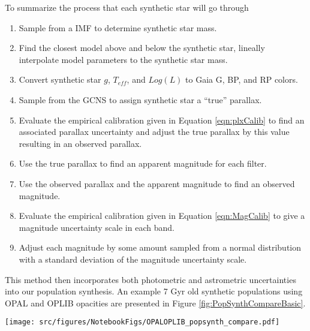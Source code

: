 To summarize the process that each synthetic star will go through
\begin{enumerate}
	\item Sample from a \citet{Sollima2019} IMF to determine synthetic star mass.
	\item Find the closest model above and below the synthetic star, lineally
		interpolate model parameters to the synthetic star mass.
	\item Convert synthetic star $g$, $T_{eff}$, and $Log(L)$ to Gaia G, BP,
		and RP colors.
	\item Sample from the GCNS to assign synthetic star a ``true'' parallax.
	\item Evaluate the empirical calibration given in Equation
		\ref{eqn:plxCalib} to find an associated parallax uncertainty and
		adjust the true parallax by this value resulting in an observed
		parallax.
	\item Use the true parallax to find an apparent magnitude for each filter.
	\item Use the observed parallax and the apparent magnitude to find an
		observed magnitude.
	\item Evaluate the empirical calibration given in Equation
		\ref{eqn:MagCalib} to give a magnitude uncertainty scale in each band.
	\item Adjust each magnitude by some amount sampled from a normal
		distribution with a standard deviation of the magnitude uncertainty
		scale.
\end{enumerate}

This method then incorporates both photometric and astrometric uncertainties
into our population synthesis. An example 7 Gyr old synthetic populations
using OPAL and OPLIB opacities are presented in Figure
\ref{fig:PopSynthCompareBasic}.

\begin{figure*}
	\centering
	\texttt{[image: src/figures/NotebookFigs/OPALOPLIB\_popsynth\_compare.pdf]}
	\caption{Population synthesis results for models evolved with OPAL (left)
	and models evolved with OPLIB (right). A Gaussian kernel-density estimate
	has been overlaid to better highlight the density variations. {\color{red}
	[THIS IS A PLACEHOLDER FIGURE]}}
	\label{fig:PopSynthCompareBasic}
\end{figure*}
